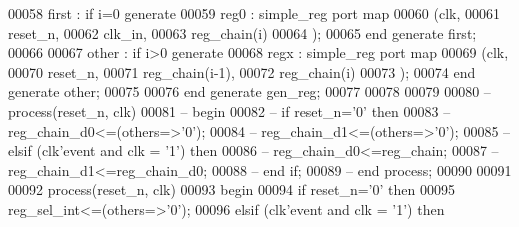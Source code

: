 \begin{DoxyCode}
00058             \textcolor{vhdlchar}{first} \textcolor{vhdlchar}{:} \textcolor{keywordflow}{if} \textcolor{vhdlchar}{i}\textcolor{vhdlchar}{=}\textcolor{vhdllogic}{}\textcolor{vhdllogic}{0} \textcolor{keywordflow}{generate}  
00059                 reg0 : simple_reg \textcolor{keywordflow}{port} \textcolor{keywordflow}{map}
00060                     (clk, 
00061                     reset_n, 
00062                     clk_in, 
00063                     reg_chain\textcolor{vhdlchar}{(}i\textcolor{vhdlchar}{)}
00064                     \textcolor{vhdlchar}{)};
00065             \textcolor{keywordflow}{end} \textcolor{keywordflow}{generate} \textcolor{vhdlchar}{first};
00066 
00067             \textcolor{vhdlchar}{other} \textcolor{vhdlchar}{:} \textcolor{keywordflow}{if} \textcolor{vhdlchar}{i}\textcolor{vhdlchar}{>}\textcolor{vhdllogic}{}\textcolor{vhdllogic}{0} \textcolor{keywordflow}{generate}
00068                 regx : simple_reg \textcolor{keywordflow}{port} \textcolor{keywordflow}{map}
00069                     (clk, 
00070                     reset_n, 
00071                     reg_chain\textcolor{vhdlchar}{(}i-\textcolor{vhdllogic}{1}\textcolor{vhdlchar}{)}, 
00072                     reg_chain\textcolor{vhdlchar}{(}i\textcolor{vhdlchar}{)}
00073                     \textcolor{vhdlchar}{)};
00074             \textcolor{keywordflow}{end} \textcolor{keywordflow}{generate} \textcolor{vhdlchar}{other};
00075                 
00076 \textcolor{keywordflow}{end} \textcolor{keywordflow}{generate} \textcolor{vhdlchar}{gen\_reg};
00077 
00078 
00079 
00080 \textcolor{keyword}{--  process(reset\_n, clk)}
00081 \textcolor{keyword}{--    begin}
00082 \textcolor{keyword}{--      if reset\_n='0' then}
00083 \textcolor{keyword}{--        reg\_chain\_d0<=(others=>'0');}
00084 \textcolor{keyword}{--        reg\_chain\_d1<=(others=>'0');}
00085 \textcolor{keyword}{--      elsif (clk'event and clk = '1') then}
00086 \textcolor{keyword}{--        reg\_chain\_d0<=reg\_chain;}
00087 \textcolor{keyword}{--          reg\_chain\_d1<=reg\_chain\_d0;}
00088 \textcolor{keyword}{--      end if;}
00089 \textcolor{keyword}{--    end process;}
00090      
00091      
00092       \textcolor{keywordflow}{process}(reset_n, clk)
00093 \textcolor{vhdlkeyword}{    begin}
00094       \textcolor{keywordflow}{if} \textcolor{vhdlchar}{reset_n}\textcolor{vhdlchar}{=}\textcolor{vhdlchar}{'}\textcolor{vhdllogic}{}\textcolor{vhdllogic}{0}\textcolor{vhdlchar}{'} \textcolor{keywordflow}{then}
00095             reg\_sel\_int<=(others=>'0');
00096         \textcolor{keywordflow}{elsif} \textcolor{vhdlchar}{(}\textcolor{vhdlchar}{clk}\textcolor{vhdlchar}{'}\textcolor{vhdlkeyword}{event} \textcolor{keywordflow}{and} \textcolor{vhdlchar}{clk} \textcolor{vhdlchar}{=} \textcolor{vhdlchar}{'}\textcolor{vhdllogic}{}\textcolor{vhdllogic}{1}\textcolor{vhdlchar}{'}\textcolor{vhdlchar}{)} \textcolor{keywordflow}{then}

\end{DoxyCode}
